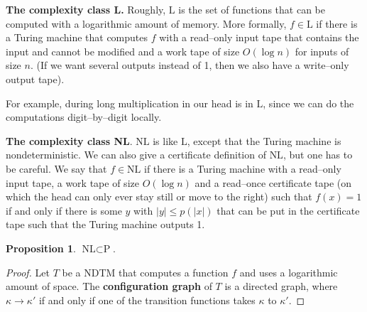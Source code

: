 \documentclass{article}
\theoremstyle{definition}
\newtheorem{prop}[theorem]{Proposition}
\begin{document}
\textbf{The complexity class L.} Roughly, $\text{L}$ is the set of functions that can be computed with a logarithmic amount of memory. More formally, $f \in \text{L}$ if there is a Turing machine that computes $f$ with a read--only input tape that contains the input and cannot be modified and a work tape of size $O(\log n)$ for inputs of size $n$. (If we want several outputs instead of 1, then we also have a write--only output tape).
\vspace{1mm}
 
For example, during long multiplication in our head is in $\text{L}$, since we can do the computations digit--by--digit locally.
\vspace{1mm}

\textbf{The complexity class NL}. $\text{NL}$ is like $\text{L}$, except that the Turing machine is nondeterministic. We can also give a certificate definition of $\text{NL}$, but one has to be careful. We say that $f \in \text{NL}$ if there is a Turing machine with a read--only input tape, a work tape of size $O(\log n)$ and a read--once certificate tape (on which the head can only ever stay still or move to the right) such that $f(x)=1$ if and only if there is some $y$ with $\left|y\right|\le p(\left|x\right|)$ that can be put in the certificate tape such that the Turing machine outputs 1.

\begin{prop}
    $\text{NL} \subset \text{P}$.
\end{prop}
\begin{proof}
    Let $T$ be a NDTM that computes a function $f$ and uses a logarithmic amount of space. The \textbf{configuration graph} of $T$ is a directed graph, where $\kappa \to \kappa'$ if and only if one of the transition functions takes $\kappa$ to $\kappa'$.
\end{proof}
\end{document}
